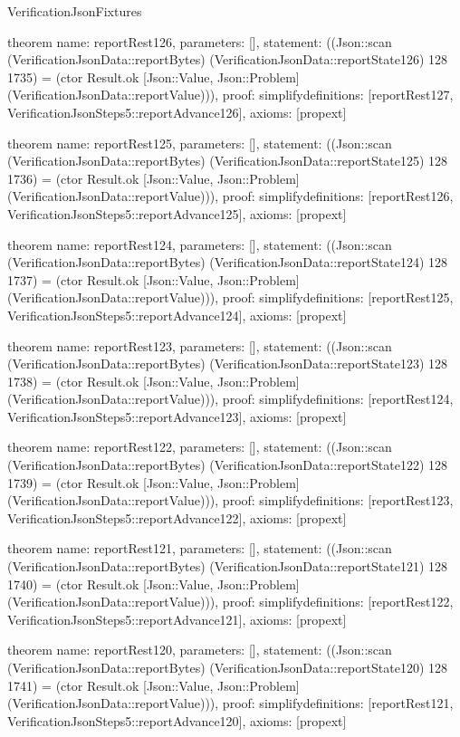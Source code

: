 \begin{lexlean}{VerificationJsonFixtures}
\begin{semanticmodule}
theorem{
  name: reportRest126,
  parameters: [],
  statement: ((Json::scan (VerificationJsonData::reportBytes) (VerificationJsonData::reportState126) 128 1735) = (ctor Result.ok [Json::Value, Json::Problem] (VerificationJsonData::reportValue))),
  proof: simplify{definitions: [reportRest127, VerificationJsonSteps5::reportAdvance126]},
  axioms: [propext]
}

theorem{
  name: reportRest125,
  parameters: [],
  statement: ((Json::scan (VerificationJsonData::reportBytes) (VerificationJsonData::reportState125) 128 1736) = (ctor Result.ok [Json::Value, Json::Problem] (VerificationJsonData::reportValue))),
  proof: simplify{definitions: [reportRest126, VerificationJsonSteps5::reportAdvance125]},
  axioms: [propext]
}

theorem{
  name: reportRest124,
  parameters: [],
  statement: ((Json::scan (VerificationJsonData::reportBytes) (VerificationJsonData::reportState124) 128 1737) = (ctor Result.ok [Json::Value, Json::Problem] (VerificationJsonData::reportValue))),
  proof: simplify{definitions: [reportRest125, VerificationJsonSteps5::reportAdvance124]},
  axioms: [propext]
}

theorem{
  name: reportRest123,
  parameters: [],
  statement: ((Json::scan (VerificationJsonData::reportBytes) (VerificationJsonData::reportState123) 128 1738) = (ctor Result.ok [Json::Value, Json::Problem] (VerificationJsonData::reportValue))),
  proof: simplify{definitions: [reportRest124, VerificationJsonSteps5::reportAdvance123]},
  axioms: [propext]
}

theorem{
  name: reportRest122,
  parameters: [],
  statement: ((Json::scan (VerificationJsonData::reportBytes) (VerificationJsonData::reportState122) 128 1739) = (ctor Result.ok [Json::Value, Json::Problem] (VerificationJsonData::reportValue))),
  proof: simplify{definitions: [reportRest123, VerificationJsonSteps5::reportAdvance122]},
  axioms: [propext]
}

theorem{
  name: reportRest121,
  parameters: [],
  statement: ((Json::scan (VerificationJsonData::reportBytes) (VerificationJsonData::reportState121) 128 1740) = (ctor Result.ok [Json::Value, Json::Problem] (VerificationJsonData::reportValue))),
  proof: simplify{definitions: [reportRest122, VerificationJsonSteps5::reportAdvance121]},
  axioms: [propext]
}

theorem{
  name: reportRest120,
  parameters: [],
  statement: ((Json::scan (VerificationJsonData::reportBytes) (VerificationJsonData::reportState120) 128 1741) = (ctor Result.ok [Json::Value, Json::Problem] (VerificationJsonData::reportValue))),
  proof: simplify{definitions: [reportRest121, VerificationJsonSteps5::reportAdvance120]},
  axioms: [propext]
}


\end{semanticmodule}
\end{lexlean}
